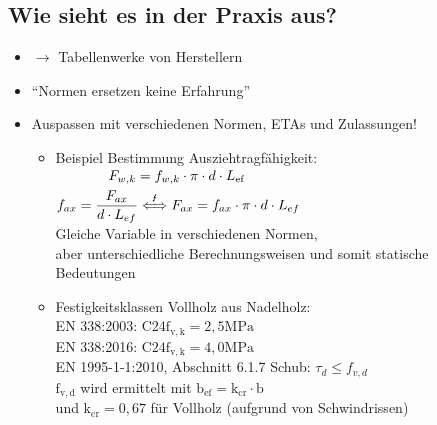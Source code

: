 \documentclass[fleqn,twoside]{article}
\begin{document}
    \subsection{Wie sieht es in der Praxis aus?}
        \begin{itemize}
            \item $\rightarrow$ Tabellenwerke von Herstellern
            \item \enquote{Normen ersetzen keine Erfahrung}
            \item Auspassen mit verschiedenen Normen, ETAs und Zulassungen!
                \begin{itemize}
                    \item Beispiel Bestimmung Ausziehtragfähigkeit:\\
                        $\begin{gathered}
                        F_{w, k}=f_{w, k} \cdot \pi \cdot d \cdot L_{\text {ef }} \\
                        f_{a x}=\frac{F_{a x}}{d \cdot L_{e f}} \overset{\text{\Lightning}}{\Longleftrightarrow} F_{a x}=f_{a x} \cdot \pi \cdot d \cdot L_{e f}
                        \end{gathered}$\\
                        Gleiche Variable in verschiedenen Normen, \\
                        aber unterschiedliche Berechnungsweisen und somit statische Bedeutungen
                    \item Festigkeitsklassen Vollholz aus Nadelholz:\\
                        EN 338:2003: $\mathrm{C} 24 \mathrm{f}_{\mathrm{v}, \mathrm{k}}=2,5 \mathrm{MPa}$\\
                        EN 338:2016: $\mathrm{C} 24 \mathrm{f}_{\mathrm{v}, \mathrm{k}}=4,0 \mathrm{MPa}$\\
                        EN 1995-1-1:2010, Abschnitt 6.1.7 Schub: $\tau_d \leq f_{v, d}$\\
                        $\mathrm{f}_{\mathrm{v}, \mathrm{d}}$ wird ermittelt mit $\mathrm{b}_{\mathrm{ef}}=\mathrm{k}_{\mathrm{cr}} \cdot \mathrm{b}$\\
                        und $\mathrm{k}_{\mathrm{cr}}=0,67$ für Vollholz (aufgrund von Schwindrissen)
                \end{itemize}
        \end{itemize}


        
\newpage
\end{document}
